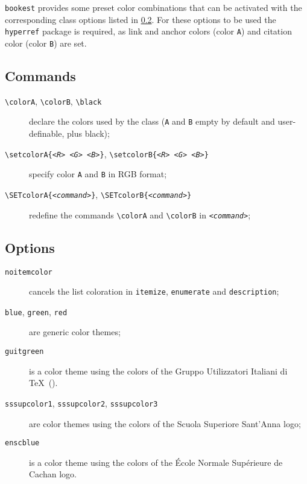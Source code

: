 \documentclass[a4paper,oneside,centered,noparindent,noparskip]{bookest}
\begin{document}
\ppar
\texttt{bookest} provides some preset color combinations that can be activated with the corresponding class options listed in \ref{coloriopzioni}. For these options to be used the \texttt{hyperref} package is required, as link and anchor colors (color \texttt{A}) and citation color (color \texttt{B}) are set.

\subsection{Commands}\label{coloricomandi}
\begin{description}
 \item[\texttt{\textbackslash colorA}, \texttt{\textbackslash colorB}, \texttt{\textbackslash black}] declare the colors used by the class (\texttt{A} and \texttt{B} empty by default and user-definable, plus black);
 \item[\texttt{\textbackslash setcolorA\{\textit{<R> <G> <B>}\}}, \texttt{\textbackslash setcolorB\{\textit{<R> <G> <B>}\}}] specify color \texttt{A} and \texttt{B} in RGB format;
 \item[\texttt{\textbackslash SETcolorA\{\textit{<command>}\}}, \texttt{\textbackslash SETcolorB\{\textit{<command>}\}}] redefine the commands \texttt{\textbackslash colorA} and \texttt{\textbackslash colorB} in \texttt{\textit{<command>}};
\end{description}

\subsection{Options}\label{coloriopzioni}
\begin{description}
 \item[\texttt{noitemcolor}] cancels the list coloration in \texttt{itemize}, \texttt{enumerate} and \texttt{description};
\end{description}
\ppar
\begin{description}
 \item[\texttt{blue}, \texttt{green}, \texttt{red}] are generic color themes;
 \item[\texttt{guitgreen}] is a color theme using the colors of the Gruppo Utilizzatori Italiani di \TeX\ (\GuIT).
 \item[\texttt{sssupcolor1}, \texttt{sssupcolor2}, \texttt{sssupcolor3}] are color themes using the colors of the Scuola Superiore Sant'Anna logo;
 \item[\texttt{enscblue}] is a color theme using the colors of the École Normale Supérieure de Cachan logo.
\end{description}
\end{document}
